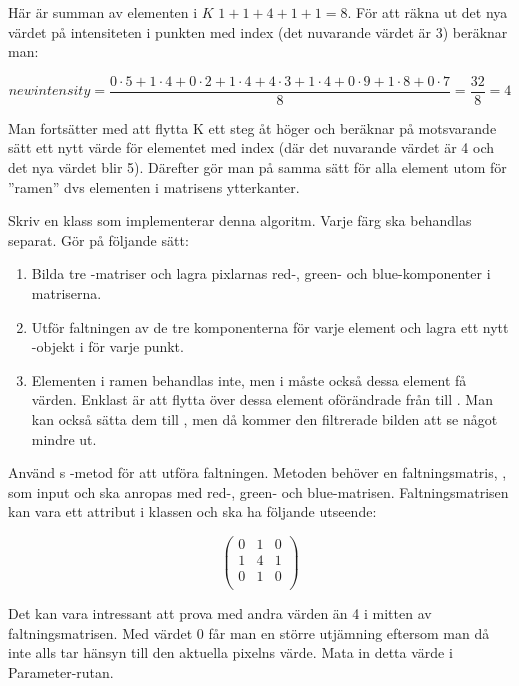 Här är summan av elementen i $K$ $1+1+4+1+1 = 8$. För att räkna ut det nya värdet på intensiteten i punkten med index  (det nuvarande värdet är 3) beräknar man:

\begin{displaymath}
\mathit{newintensity} = \frac{0 \cdot 5 + 1 \cdot 4 + 0 \cdot 2 + 1 \cdot 4 + 4 \cdot 3 + 1 \cdot 4 + 0 \cdot 9 + 1 \cdot 8 + 0 \cdot 7}{8} = \frac{32}{8} = 4
\end{displaymath}


Man fortsätter med att flytta K ett steg åt höger och beräknar på motsvarande sätt ett nytt värde för elementet med index  (där det nuvarande värdet är 4 och det nya värdet blir 5). Därefter gör man på samma sätt för alla element utom för ”ramen” dvs elementen i matrisens ytterkanter.

Skriv en klass  som implementerar denna algoritm. Varje färg ska behandlas separat. Gör på följande sätt:
\begin{enumerate}
	\item Bilda tre -matriser och lagra pixlarnas red-, green- och blue-komponenter i matriserna.
	\item Utför faltningen av de tre komponenterna för varje element och lagra ett nytt -objekt i  för varje punkt.
	\item Elementen i ramen behandlas inte, men i  måste också dessa element få värden. Enklast är att flytta över dessa element oförändrade från  till . Man kan också sätta dem till , men då kommer den filtrerade bilden att se något mindre ut.
\end{enumerate}

Använd s -metod för att utföra faltningen. Metoden behöver en faltningsmatris, , som input och ska anropas med red-, green- och blue-matrisen. Faltningsmatrisen kan vara ett attribut i klassen och ska ha följande utseende:

\begin{displaymath}
\begin{pmatrix}
  0 & 1 & 0 \\
  1 & 4 & 1 \\
  0 & 1 & 0 \\
\end{pmatrix}
\end{displaymath}

Det kan vara intressant att prova med andra värden än 4 i mitten av faltningsmatrisen. Med värdet 0 får man en större utjämning eftersom man då inte alls tar hänsyn till den aktuella pixelns värde. Mata in detta värde i Parameter-rutan.

